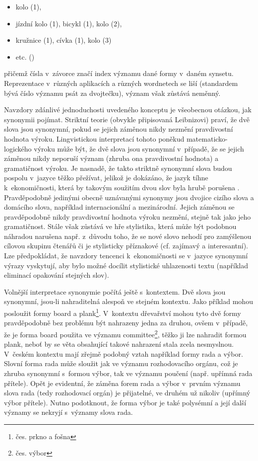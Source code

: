 \documentclass[a4paper,11pt,openany,twoside]{book}
\newcommand\ex{\textsf}
\begin{document}
					\begin{itemize}
						\item \ex{kolo (1)},
						\item \ex{jízdní kolo (1), bicykl (1), kolo (2)},
						\item \ex{kružnice (1), cívka (1), kolo (3)}
						\item[] etc. (\textcite{pala2004building})
					\end{itemize}

					přičemž čísla v~závorce značí index významu dané formy v~daném synsetu. Reprezentace v~různých aplikacích a různých wordnetech se liší (standardem bývá číslo významu psát za dvojtečku), význam však zůstává neměnný. 

					Navzdory zdánlivé jednoduchosti uvedeného konceptu je všeobecnou otázkou, jak synonymii pojímat. Striktní teorie (obvykle připisovaná Leibnizovi) praví, že dvě slova jsou synonymní, pokud se jejich záměnou nikdy nezmění pravdivostní hodnota výroku. Lingvistickou interpretací tohoto poněkud matematicko-logického výroku může být, že dvě slova jsou synonymní v~případě, že se jejich záměnou nikdy neporuší význam (zhruba ona pravdivostní hodnota) a gramatičnost výroku. Je nasnadě, že takto striktně synonymní slova budou pospolu v~jazyce těžko přežívat, jelikož je dokázáno, že jazyk tíhne k~ekonomičnosti, která by takovým soužitím dvou slov byla hrubě porušena \parencite{Lotko2003}. Pravděpodobně jedinými obecně uznávanými synonymy jsou dvojice cizího slova a domácího slova, například \ex{internacionální} a \ex{mezinárodní}. Jejich záměnou se pravděpodobně nikdy pravdivostní hodnota výroku nezmění, stejně tak jako jeho gramatičnost. Stále však zůstává ve hře stylistika, která může být podobnou náhradou narušena např. z~důvodu toho, že se nové slovo nehodí pro zamýšlenou cílovou skupinu čtenářů či je stylisticky příznakové (cf. \ex{zajímavý} a \ex{interesantní}). Lze předpokládat, že navzdory tencenci k~ekonomičnosti se v~jazyce synonymní výrazy vyskytují, aby bylo možné docílit stylistické uhlazenosti textu (například eliminací opakování stejných slov).

					Volnější interpretace synonymie počítá ještě s~kontextem. Dvě slova jsou synonymní, jsou-li nahraditelná alespoň ve stejném kontextu. Jako příklad mohou posloužit formy \ex{board} a \ex{plank}\footnote{čes. \ex{prkno} a \ex{fošna}}. V~kontextu dřevařství mohou tyto dvě formy pravděpodobně bez problému být nahrazeny jedna za druhou, ovšem v~případě, že je forma \ex{board} použita ve významu \ex{committee}\footnote{čes. \ex{výbor}}, těžko ji lze nahradit formou \ex{plank}, neboť by se věta obsahující takové nahrazení stala zcela nesmyslnou. \parencite{miller1990introduction} V~českém kontextu mají zřejmě podobný vztah například formy \ex{rada} a \ex{výbor}. Slovní forma \ex{rada} může sloužit jak ve významu rozhodovacího orgánu, což je zhruba synonymní s~formou \ex{výbor}, tak ve významu poučení (např. \ex{upřímná rada přítele}). Opět je evidentní, že záměna forem \ex{rada} a \ex{výbor} v~prvním významu slova \ex{rada} (tedy rozhodovací orgán) je přijatelné, ve druhém už nikoliv (\ex{upřímný výbor přítele}). Nutno podotknout, že forma \ex{výbor} je také polysémní a její další významy se nekryjí s~významy slova \ex{rada}. \parencite{Havranek1989}
\end{document}
